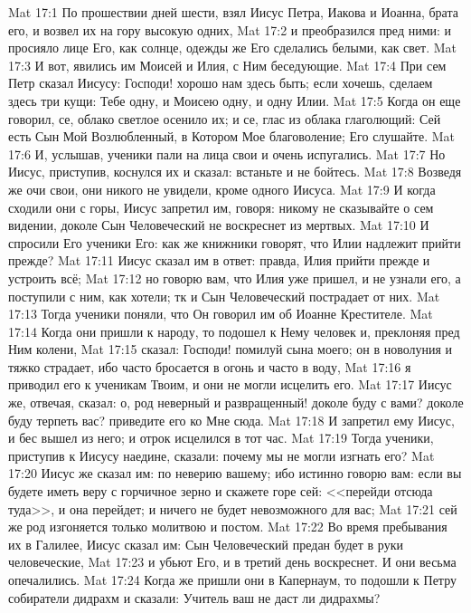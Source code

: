 \vs Mat 17:1 По прошествии дней шести, взял Иисус Петра, Иакова и Иоанна, брата его, и возвел их на гору высокую одних,
\vs Mat 17:2 и преобразился пред ними: и просияло лице Его, как солнце, одежды же Его сделались белыми, как свет.
\vs Mat 17:3 И вот, явились им Моисей и Илия, с Ним беседующие.
\vs Mat 17:4 При сем Петр сказал Иисусу: Господи! хорошо нам здесь быть; если хочешь, сделаем здесь три кущи: Тебе одну, и Моисею одну, и одну Илии.
\vs Mat 17:5 Когда он еще говорил, се, облако светлое осенило их; и се, глас из облака глаголющий: Сей есть Сын Мой Возлюбленный, в Котором Мое благоволение; Его слушайте.
\vs Mat 17:6 И, услышав, ученики пали на лица свои и очень испугались.
\vs Mat 17:7 Но Иисус, приступив, коснулся их и сказал: встаньте и не бойтесь.
\vs Mat 17:8 Возведя же очи свои, они никого не увидели, кроме одного Иисуса.
\vs Mat 17:9 И когда сходили они с горы, Иисус запретил им, говоря: никому не сказывайте о сем видении, доколе Сын Человеческий не воскреснет из мертвых.
\vs Mat 17:10 И спросили Его ученики Его: как же книжники говорят, что Илии надлежит прийти прежде?
\vs Mat 17:11 Иисус сказал им в ответ: правда, Илия  прийти прежде и устроить всё;
\vs Mat 17:12 но говорю вам, что Илия уже пришел, и не узнали его, а поступили с ним, как хотели; тк и Сын Человеческий пострадает от них.
\vs Mat 17:13 Тогда ученики поняли, что Он говорил им об Иоанне Крестителе.
\rsbpar\vs Mat 17:14 Когда они пришли к народу, то подошел к Нему человек и, преклоняя пред Ним колени,
\vs Mat 17:15 сказал: Господи! помилуй сына моего; он в новолуния  и тяжко страдает, ибо часто бросается в огонь и часто в воду,
\vs Mat 17:16 я приводил его к ученикам Твоим, и они не могли исцелить его.
\vs Mat 17:17 Иисус же, отвечая, сказал: о, род неверный и развращенный! доколе буду с вами? доколе буду терпеть вас? приведите его ко Мне сюда.
\vs Mat 17:18 И запретил ему Иисус, и бес вышел из него; и отрок исцелился в тот час.
\vs Mat 17:19 Тогда ученики, приступив к Иисусу наедине, сказали: почему мы не могли изгнать его?
\vs Mat 17:20 Иисус же сказал им: по неверию вашему; ибо истинно говорю вам: если вы будете иметь веру с горчичное зерно и скажете горе сей: <<перейди отсюда туда>>, и она перейдет; и ничего не будет невозможного для вас;
\vs Mat 17:21 сей же род изгоняется только молитвою и постом.
\rsbpar\vs Mat 17:22 Во время пребывания их в Галилее, Иисус сказал им: Сын Человеческий предан будет в руки человеческие,
\vs Mat 17:23 и убьют Его, и в третий день воскреснет. И они весьма опечалились.
\rsbpar\vs Mat 17:24 Когда же пришли они в Капернаум, то подошли к Петру собиратели дидрахм и сказали: Учитель ваш не даст ли дидрахмы?
